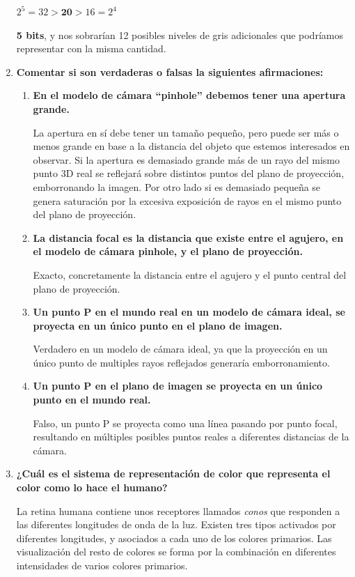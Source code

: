 \documentclass[13pt,a4paper]{article}
\begin{document}
\begin{enumerate}
  $2^{5} = 32 > \textbf{20} > 16 = 2^{4}$ 
  
  \textbf{5 bits}, y nos sobrarían 12 posibles niveles de gris adicionales que podríamos representar con la misma cantidad. 
  \item \textbf{Comentar si son verdaderas o falsas la siguientes afirmaciones:}
    \begin{enumerate}
      \item \textbf{En el modelo de cámara “pinhole” debemos tener una apertura grande.}

      La apertura en sí debe tener un tamaño pequeño, pero puede ser más o menos grande en base a la distancia del objeto que estemos interesados en observar.
      Si la apertura es demasiado grande más de un rayo del mismo punto 3D real se reflejará sobre distintos puntos del plano de proyección, emborronando la imagen.
      Por otro lado si es demasiado pequeña se genera saturación por la excesiva exposición de rayos en el mismo punto del plano de proyección.      
      \item \textbf{La distancia focal es la distancia que existe entre el agujero, en el modelo de cámara pinhole, y el plano de proyección.}

      Exacto, concretamente la distancia entre el agujero y el punto central del plano de proyección.
      \item \textbf{Un punto P en el mundo real en un modelo de cámara ideal, se proyecta en un único punto en el plano de imagen.}

      Verdadero en un modelo de cámara ideal, ya que la proyección en un único punto de multiples rayos reflejados generaría emborronamiento.
      \item \textbf{Un punto P en el plano de imagen se proyecta en un único punto en el mundo real.}

      Falso, un punto P se proyecta como una línea pasando por punto focal, resultando en múltiples posibles puntos reales a diferentes distancias de la cámara.
    \end{enumerate}
  \item \textbf{¿Cuál es el sistema de representación de color que representa el color como lo hace el humano?}

  La retina humana contiene unos receptores llamados \textit{conos} que responden a las diferentes longitudes de onda de la luz. Existen tres tipos activados por diferentes longitudes, y asociados a cada uno de los colores primarios. Las visualización del resto de colores se forma por la combinación en diferentes intensidades de varios colores primarios.


\end{enumerate}
\end{document}
